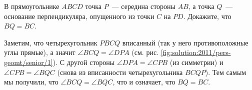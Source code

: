 В прямоугольнике $ABCD$ точка $P$~--- середина стороны $AB$, а точка
$Q$~--- основание перпендикуляра, опущенного из точки $C$ на $PD$.
Докажите, что $BQ = BC$.

%
\label{solution:2011/pers-geomt/senior/1}%
Заметим, что четырехугольник $PBCQ$ вписанный
(так у него противоположные углы прямые),
а значит $\angle BCQ = \angle DPA$
(см. рис. \ref{fig:solution:2011/pers-geomt/senior/1}).
С другой стороны $\angle DPA = \angle CPB$ (из симметрии) и
$\angle CPB = \angle BQC$ (снова из вписанности четырехугольника $BCQP$).
Тем самым мы получили, что $\angle BCQ = \angle BQC$, что и означает, что
$BQ = BC$.

